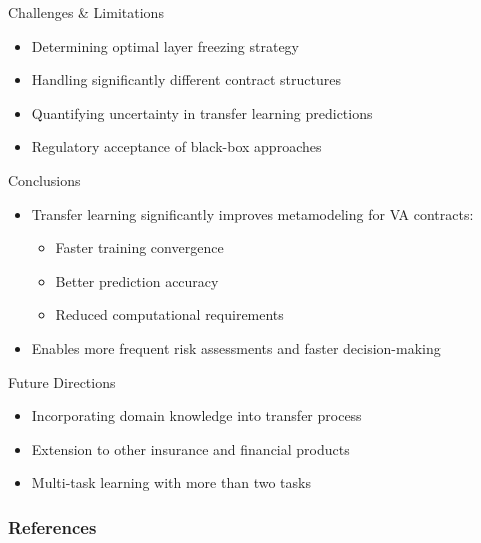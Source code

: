 \documentclass[9pt,handout]{beamer}
\begin{document}
    \begin{frame}{Challenges \& Limitations}
    \begin{itemize}
        \item Determining optimal layer freezing strategy
        \item Handling significantly different contract structures
        \item Quantifying uncertainty in transfer learning predictions
        \item Regulatory acceptance of black-box approaches
    \end{itemize}
    \end{frame}
    
    \begin{frame}{Conclusions}
    \begin{itemize}
        \item Transfer learning significantly improves metamodeling for VA contracts:
        \begin{itemize}
            \item Faster training convergence
            \item Better prediction accuracy
            \item Reduced computational requirements
        \end{itemize}
        \item Enables more frequent risk assessments and faster decision-making
    \end{itemize}
    \end{frame}
    
    \begin{frame}{Future Directions}
    \begin{itemize}
        \item Incorporating domain knowledge into transfer process
        \item Extension to other insurance and financial products
        \item Multi-task learning with more than two tasks
    \end{itemize}
    \end{frame}


\begin{frame}
    \frametitle{References}
    
    
\end{frame}
\end{document}
